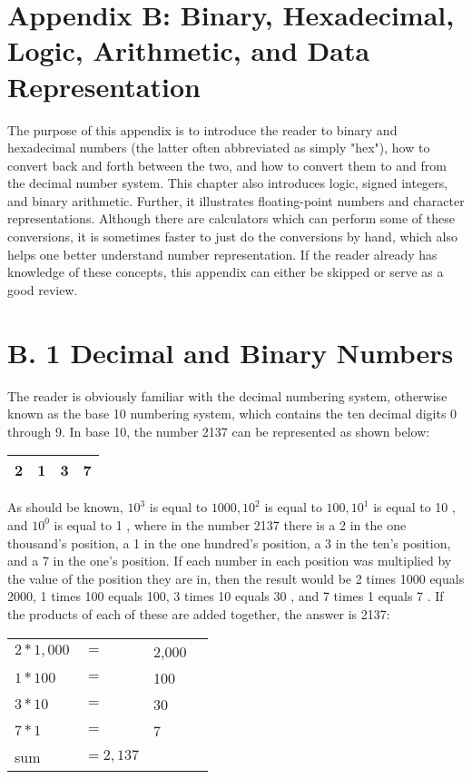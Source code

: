 \documentclass[10pt]{article}
\begin{document}
\section*{Appendix B: Binary, Hexadecimal, Logic, Arithmetic, and Data Representation}
The purpose of this appendix is to introduce the reader to binary and hexadecimal numbers (the latter often abbreviated as simply "hex"), how to convert back and forth between the two, and how to convert them to and from the decimal number system. This chapter also introduces logic, signed integers, and binary arithmetic. Further, it illustrates floating-point numbers and character representations. Although there are calculators which can perform some of these conversions, it is sometimes faster to just do the conversions by hand, which also helps one better understand number representation. If the reader already has knowledge of these concepts, this appendix can either be skipped or serve as a good review.

\section*{B. 1 Decimal and Binary Numbers}
The reader is obviously familiar with the decimal numbering system, otherwise known as the base 10 numbering system, which contains the ten decimal digits 0 through 9. In base 10, the number 2137 can be represented as shown below:

\begin{center}
\begin{tabular}{|l|l|l|l|}
\hline
2 & 1 & 3 & 7 \\
\hline
\end{tabular}
\end{center}

As should be known, $10^{3}$ is equal to $1000,10^{2}$ is equal to $100,10^{1}$ is equal to 10 , and $10^{0}$ is equal to 1 , where in the number 2137 there is a 2 in the one thousand's position, a 1 in the one hundred's position, a 3 in the ten's position, and a 7 in the one's position. If each number in each position was multiplied by the value of the position they are in, then the result would be 2 times 1000 equals 2000, 1 times 100 equals 100, 3 times 10 equals 30 , and 7 times 1 equals 7 . If the products of each of these are added together, the answer is 2137:

\begin{center}
\begin{tabular}{lllr}
$2 * 1,000$ & $=$ & 2,000 \\
$1 * 100$ & $=$ & 100 \\
$3 * 10$ & $=$ & 30 \\
$7 * 1$ & $=$ & 7 \\
\hline
sum & $=2,137$ &  \\
\hline
\end{tabular}
\end{center}
\end{document}
